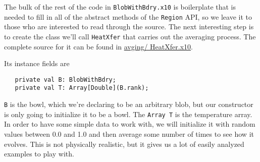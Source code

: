 The bulk of the rest of the code in {\tt BlobWithBdry.x10} is boilerplate that
is needed to fill in all of the abstract methods of the {\tt Region} API, so we
leave it to those who are interested to read through the source.  The next
interesting step is to create the class we'll call {\tt HeatXfer}
that carries out the averaging process.  The complete source for it can be found
in
\href{http://dist.codehaus.org/x10/documentation/guide/src/avging/HeatXfer.x10}{avging/
HeatXfer.x10}.

Its instance fields are
\begin{verbatim}
   private val B: BlobWithBdry; 
   private val T: Array[Double](B.rank);
\end{verbatim}
{\tt B} is the bowl, which we're declaring to be an arbitrary blob, but our
constructor is only going to initialize it to be a bowl.
The {\tt Array T} is the temperature array. In order to have some simple 
data to work with, we will initialize it with random
values between 0.0 and 1.0 and then average some number of times to see how it
evolves.  This is not physically realistic, but it gives us a lot of easily
analyzed examples to play with.


